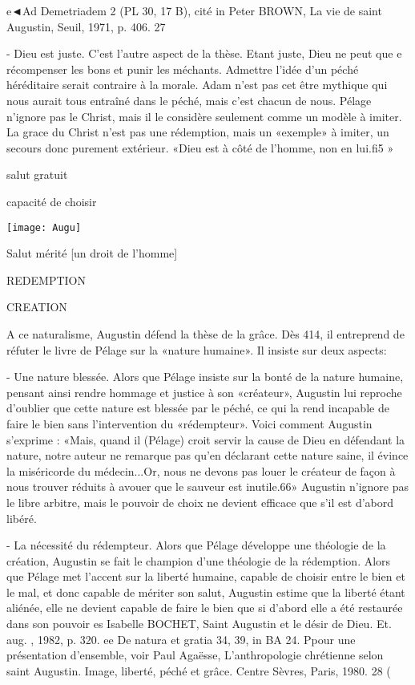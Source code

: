 e◄Ad Demetriadem 2 (PL 30, 17 B), cité in Peter BROWN, La vie de saint Augustin, Seuil, 1971, p.
406.
27
 
- Dieu est	juste. C'est l'autre aspect de la thèse. Etant juste, Dieu ne peut que	e
récompenser les bons et punir les méchants. Admettre l'idée d'un péché héréditaire
serait contraire à la morale. Adam n'est pas cet être mythique qui nous aurait tous entraîné dans le péché, mais c'est chacun de nous. Pélage n'ignore pas le Christ, mais il le considère seulement comme un modèle à imiter. La grace du Christ n'est pas une rédemption, mais un «exemple» à imiter,  un secours donc purement extérieur.
«Dieu est à côté de l'homme, non en lui.fi5 »

\begin{Def}[Grâce]
salut	gratuit
\end{Def} 
 

\begin{Def}[Liberté]
capacité de choisir
\end{Def} 

 \texttt{[image: Augu]}





Salut	mérité [un droit de l'homme]
 



REDEMPTION





CREATION
 


A ce naturalisme, Augustin défend la thèse de la grâce. Dès 414, il entreprend de réfuter le livre de Pélage sur la «nature humaine». Il insiste sur deux aspects:

-	Une		nature	blessée.	Alors que Pélage insiste sur la bonté de la nature humaine, pensant ainsi rendre hommage et justice à son «créateur», Augustin lui reproche d'oublier que cette nature est blessée par le péché, ce qui la rend incapable de faire le bien sans l'intervention du «rédempteur».		Voici comment Augustin s'exprime :	«Mais, quand il (Pélage) croit servir la cause de Dieu en défendant la nature, notre auteur ne remarque pas qu'en déclarant cette nature saine, il évince la miséricorde du médecin...Or, nous ne devons pas louer le créateur de façon à nous trouver réduits à avouer que le sauveur est inutile.66»	Augustin n'ignore pas le libre arbitre, mais le pouvoir de choix ne devient efficace que s'il est d'abord libéré.

-	La nécessité du rédempteur. Alors que Pélage développe une théologie de la création, Augustin se fait le champion d'une théologie de la rédemption. Alors que Pélage met l'accent sur la liberté humaine, capable de choisir entre le bien et le mal, et donc capable de mériter son salut, Augustin estime que la liberté étant aliénée, elle ne devient capable de faire le bien que si d'abord elle a été restaurée dans son pouvoir
es Isabelle BOCHET, Saint Augustin et le désir de Dieu. Et. aug. , 1982, p. 320.
ee De natura et gratia 34, 39, in BA 24. Ppour une présentation d'ensemble, voir Paul Agaësse, L'anthropologie chrétienne selon saint Augustin. Image, liberté, péché et grâce. Centre Sèvres, Paris, 1980.
28	(
 
